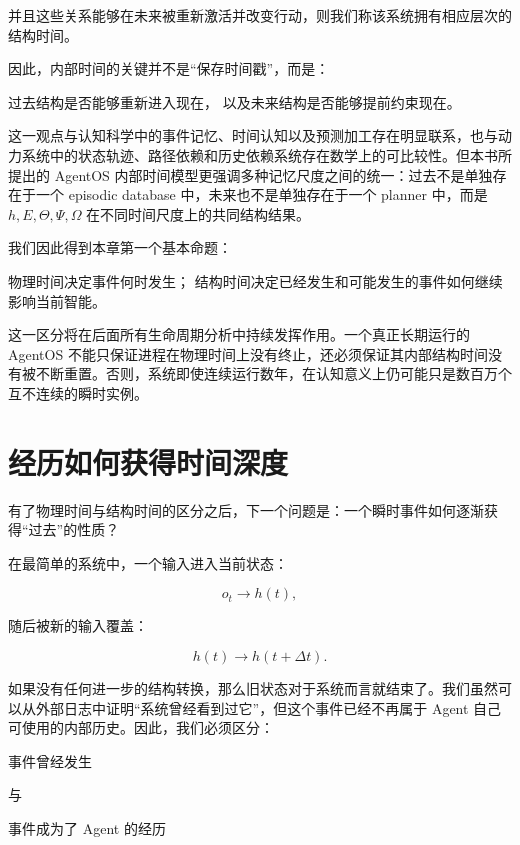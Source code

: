 并且这些关系能够在未来被重新激活并改变行动，则我们称该系统拥有相应层次的结构时间。

因此，内部时间的关键并不是“保存时间戳”，而是：

\begin{statementbox}
过去结构是否能够重新进入现在，
以及未来结构是否能够提前约束现在。
\end{statementbox}

这一观点与认知科学中的事件记忆、时间认知以及预测加工存在明显联系，也与动力系统中的状态轨迹、路径依赖和历史依赖系统存在数学上的可比较性。但本书所提出的 AgentOS 内部时间模型更强调多种记忆尺度之间的统一：过去不是单独存在于一个 episodic database 中，未来也不是单独存在于一个 planner 中，而是 $h,E,\Theta,\Psi,\Omega$ 在不同时间尺度上的共同结构结果。

我们因此得到本章第一个基本命题：

\begin{proposition*}
物理时间决定事件何时发生；
结构时间决定已经发生和可能发生的事件如何继续影响当前智能。
\end{proposition*}

这一区分将在后面所有生命周期分析中持续发挥作用。一个真正长期运行的 AgentOS 不能只保证进程在物理时间上没有终止，还必须保证其内部结构时间没有被不断重置。否则，系统即使连续运行数年，在认知意义上仍可能只是数百万个互不连续的瞬时实例。

\section{经历如何获得时间深度}

有了物理时间与结构时间的区分之后，下一个问题是：一个瞬时事件如何逐渐获得“过去”的性质？

在最简单的系统中，一个输入进入当前状态：

\[
o_t
\rightarrow
h(t),
\]

随后被新的输入覆盖：

\[
h(t)
\rightarrow
h(t+\Delta t).
\]

如果没有任何进一步的结构转换，那么旧状态对于系统而言就结束了。我们虽然可以从外部日志中证明“系统曾经看到过它”，但这个事件已经不再属于 Agent 自己可使用的内部历史。因此，我们必须区分：

\begin{statementbox}
事件曾经发生
\end{statementbox}

与

\begin{statementbox}
事件成为了 Agent 的经历
\end{statementbox}

